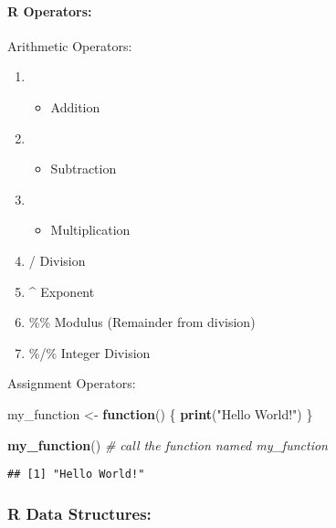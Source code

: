 \documentclass[
]{article}
\newenvironment{Shaded}{\begin{snugshade}}{\end{snugshade}}
\newcommand{\CommentTok}[1]{\textcolor[rgb]{0.56,0.35,0.01}{\textit{#1}}}
\newcommand{\ControlFlowTok}[1]{\textcolor[rgb]{0.13,0.29,0.53}{\textbf{#1}}}
\newcommand{\FunctionTok}[1]{\textcolor[rgb]{0.13,0.29,0.53}{\textbf{#1}}}
\newcommand{\NormalTok}[1]{#1}
\newcommand{\OtherTok}[1]{\textcolor[rgb]{0.56,0.35,0.01}{#1}}
\newcommand{\StringTok}[1]{\textcolor[rgb]{0.31,0.60,0.02}{#1}}
\providecommand{\tightlist}{%
  \setlength{\itemsep}{0pt}\setlength{\parskip}{0pt}}
\begin{document}
\hypertarget{r-operators-1}{%
\paragraph{R Operators:}\label{r-operators-1}}

Arithmetic Operators:

\begin{enumerate}
\def\labelenumi{\arabic{enumi}.}
\item
  \begin{itemize}
  \tightlist
  \item
    Addition
  \end{itemize}
\item
  \begin{itemize}
  \tightlist
  \item
    Subtraction
  \end{itemize}
\item
  \begin{itemize}
  \tightlist
  \item
    Multiplication\\
  \end{itemize}
\item
  / Division\\
\item
  \^{} Exponent\\
\item
  \%\% Modulus (Remainder from division)\\
\item
  \%/\% Integer Division
\end{enumerate}

Assignment Operators:

\begin{Shaded}
\begin{Highlighting}[]
\NormalTok{my\_function }\OtherTok{\textless{}{-}} \ControlFlowTok{function}\NormalTok{() \{}
  \FunctionTok{print}\NormalTok{(}\StringTok{"Hello World!"}\NormalTok{)}
\NormalTok{\}}

\FunctionTok{my\_function}\NormalTok{() }\CommentTok{\# call the function named my\_function}
\end{Highlighting}
\end{Shaded}

\begin{verbatim}
## [1] "Hello World!"
\end{verbatim}

\hypertarget{r-data-structures}{%
\subsubsection{R Data Structures:}\label{r-data-structures}}
\end{document}
